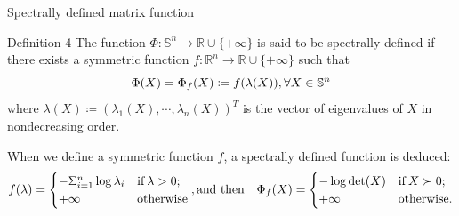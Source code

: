 \documentclass[aspectratio=169, dvipdfmx, 11pt]{beamer}
\newcommand{\RealNumberSet}{\mathbb{R}}
\newcommand{\NDemenstionalRealEuclideanSpace}{\mathbb{R}^n}
\newcommand{\NDemenstionalRealSymmetricMatrixSpace}{\mathbb{S}^n}
\newcommand{\ExtendedRealValuedFunction}[2]{{#1}: {#2} \to \RealNumberSet \cup \{+\infty\}}
\begin{document}
\begin{frame}{Spectrally defined matrix function}
  \begin{block}{Definition 4}
    The function $\ExtendedRealValuedFunction{\Phi}{\NDemenstionalRealSymmetricMatrixSpace}$ is said to be spectrally defined if there exists a symmetric function $\ExtendedRealValuedFunction{f}{\NDemenstionalRealEuclideanSpace}$ such that
    \begin{equation}
      \Phi (X) = \Phi_{f}(X) \coloneqq f(\lambda (X)), \forall X \in \NDemenstionalRealSymmetricMatrixSpace \notag
    \end{equation}
    where $\lambda (X) \coloneqq (\lambda_1 (X), \dotsb , \lambda_n (X))^T$ is the vector of eigenvalues of $X$ in nondecreasing order.
  \end{block}

  \pause
  \begin{example}
    When we define a symmetric function $f$, a spectrally defined function is deduced:
      \begin{equation}
        f(\lambda)=
          \begin{cases}
            - \Sigma_{i = 1}^{n} \log \lambda_i & \text{\rm if}\:\lambda > 0; \\
            +\infty & \text{\rm otherwise} \notag
          \end{cases} ,\text{\rm and then} \quad
          \Phi_{f}(X)=
          \begin{cases}
            - \log \det (X) & \text{\rm if}\:X \succ 0; \\
            +\infty & \text{\rm otherwise}. \notag
          \end{cases}
      \end{equation}
  \end{example}
\end{frame}
\end{document}

